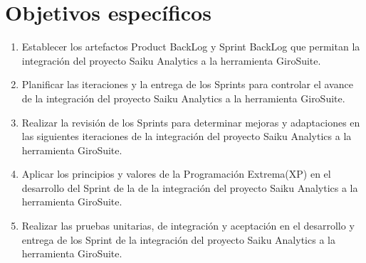 \section{Objetivos espec\'{i}ficos}
\begin{spacing}{1.5}
	\begin{enumerate}[label=\alph*)]
		\item Establecer los artefactos Product BackLog y Sprint BackLog que permitan la integraci\'{o}n del proyecto Saiku Analytics a la herramienta GiroSuite.
		\item Planificar las iteraciones y la entrega de los Sprints para controlar el avance de la integraci\'{o}n del proyecto Saiku Analytics a la herramienta GiroSuite.
		\item Realizar la revisi\'{o}n de los Sprints para determinar mejoras y adaptaciones en las siguientes iteraciones de la integraci\'{o}n del proyecto Saiku Analytics a la herramienta GiroSuite.
		\item Aplicar los principios y valores de la Programaci\'{o}n Extrema(XP) en el desarrollo del Sprint de la de la integraci\'{o}n del proyecto Saiku Analytics a la herramienta GiroSuite.
		\item Realizar las pruebas unitarias, de integraci\'{o}n y aceptaci\'{o}n en el desarrollo y entrega de los Sprint de  la integraci\'{o}n del proyecto Saiku Analytics a la herramienta GiroSuite.
	\end{enumerate}	
\end{spacing}


	
